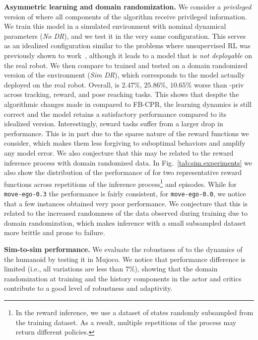 \textbf{Asymmetric learning and domain randomization.} We consider a \emph{privileged} version of \method{} where all components of the algorithm receive privileged information. We train this model in a simulated environment with nominal dynamical parameters (\emph{No DR}), and we test it in the very same configuration. This serves as an idealized configuration similar to the problems where unsupervised RL was previously shown to work~\citep{TirinzoniTFGKXL25zeroshot}, although it leads to a model that is \emph{not deployable} on the real robot. We then compare to \method{} trained and tested on a domain randomized version of the environment (\emph{Sim DR}), which corresponds to the model actually deployed on the real robot. Overall, \method{} is $2.47\%$, $25.86\%$, $10.65\%$ worse than \method{}-priv across tracking, reward, and pose reaching tasks. This shows that despite the algorithmic changes made in \method{} compared to FB-CPR, the learning dynamics is still correct and the model retains a satisfactory performance compared to its idealized version. Interestingly, reward tasks suffer from a larger drop in performance. This is in part due to the sparse nature of the reward functions we consider, which makes them less forgiving to suboptimal behaviors and amplify any model error. We also conjecture that this may be related to the reward inference process with domain randomized data. In Fig.~\ref{tab:sim.experiments} we also show the distribution of the performance of \method{} for two representative reward functions across repetitions of the inference process\footnote{In the reward inference, we use a dataset of states randomly subsampled from the training dataset. As a result, multiple repetitions of the process may return different policies.} and episodes. While for \texttt{move-ego-0.3} the performance is fairly consistent, for \texttt{move-ego-0.0}, we notice that a few instances obtained very poor performance. We conjecture that this is related to the increased randomness of the data observed during training due to domain randomization, which makes inference with a small subsampled dataset more brittle and prone to failure.


\textbf{Sim-to-sim performance.} We evaluate the robustness of \method{} to the dynamics of the humanoid by testing it in Mujoco. We notice that performance difference is limited (i.e., all variations are less than $7\%$), showing that the domain randomization at training and the history components in the actor and critics contribute to a good level of robustness and adaptivity.


